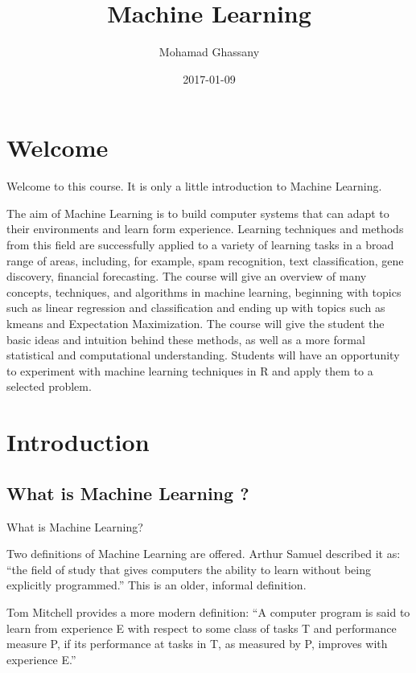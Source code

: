 \documentclass[]{book}
\title{Machine Learning}
\author{Mohamad Ghassany}
\date{2017-01-09}
\begin{document}
\maketitle

{
\setcounter{tocdepth}{2}
\tableofcontents
}
\chapter*{Welcome}\label{welcome}

Welcome to this course. It is only a little introduction to Machine
Learning.

The aim of Machine Learning is to build computer systems that can adapt
to their environments and learn form experience. Learning techniques and
methods from this field are successfully applied to a variety of
learning tasks in a broad range of areas, including, for example, spam
recognition, text classification, gene discovery, financial forecasting.
The course will give an overview of many concepts, techniques, and
algorithms in machine learning, beginning with topics such as linear
regression and classification and ending up with topics such as kmeans
and Expectation Maximization. The course will give the student the basic
ideas and intuition behind these methods, as well as a more formal
statistical and computational understanding. Students will have an
opportunity to experiment with machine learning techniques in R and
apply them to a selected problem.

\chapter*{Introduction}\label{introduction}

\section*{What is Machine Learning ?}\label{what-is-machine-learning}

What is Machine Learning?

Two definitions of Machine Learning are offered. Arthur Samuel described
it as: ``the field of study that gives computers the ability to learn
without being explicitly programmed.'' This is an older, informal
definition.

Tom Mitchell provides a more modern definition: ``A computer program is
said to learn from experience E with respect to some class of tasks T
and performance measure P, if its performance at tasks in T, as measured
by P, improves with experience E.''
\end{document}

